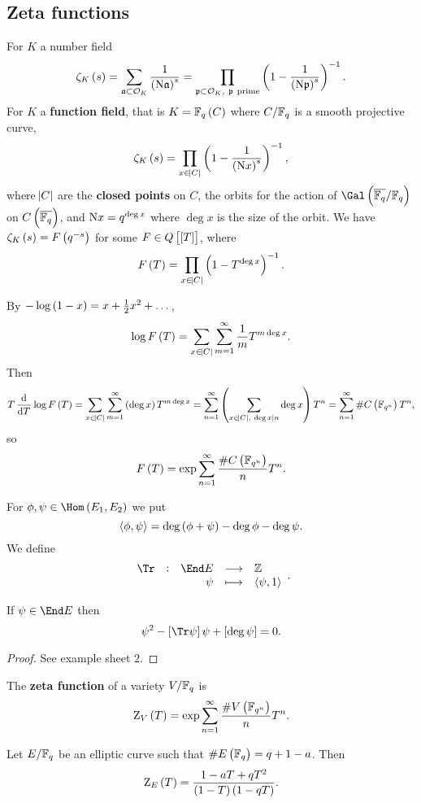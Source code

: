 \subsection{Zeta functions}

For $ K $ a number field
$$ \zeta_K\br{s} = \sum_{\aaa \subset \OOO_K} \dfrac{1}{\br{\N\aaa}^s} = \prod_{\ppp \subset \OOO_K, \ \ppp \ \text{prime}} \br{1 - \dfrac{1}{\br{\N\ppp}^s}}^{-1}. $$
For $ K $ a \textbf{function field}, that is $ K = \FF_q\br{C} $ where $ C / \mathbb{F}_q $ is a smooth projective curve,
$$ \zeta_K\br{s} = \prod_{x \in \abs{C}} \br{1 - \dfrac{1}{\br{\N x}^s}}^{-1}, $$
where $ \abs{C} $ are the \textbf{closed points} on $ C $, the orbits for the action of $ \Gal\br{\overline{\FF_q} / \FF_q} $ on $ C\br{\overline{\FF_q}} $, and $ \mathrm{N} x = q^{\deg x} $ where $ \deg x $ is the size of the orbit. We have $ \zeta_K\br{s} = F\br{q^{-s}} $ for some $ F \in Q\sbr{\sbr{T}} $, where
$$ F\br{T} = \prod_{x \in \abs{C}} \br{1 - T^{\deg x}}^{-1}. $$

\pagebreak

By $ -\log \br{1 - x} = x + \tfrac{1}{2}x^2 + \dots $,
$$ \log F\br{T} = \sum_{x \in \abs{C}} \sum_{m = 1}^\infty \dfrac{1}{m}T^{m\deg x}. $$
Then
$$ T\dod{}{T}\log F\br{T} = \sum_{x \in \abs{C}} \sum_{m = 1}^\infty \br{\deg x}T^{m\deg x} = \sum_{n = 1}^\infty \br{\sum_{x \in \abs{C}, \ \deg x \mid n} \deg x}T^n = \sum_{n = 1}^\infty \#C\br{\FF_{q^n}}T^n, $$
so
$$ F\br{T} = \exp \sum_{n = 1}^\infty \dfrac{\#C\br{\FF_{q^n}}}{n}T^n. $$


For $ \phi, \psi \in \Hom\br{E_1, E_2} $ we put
$$ \abr{\phi, \psi} = \deg \br{\phi + \psi} - \deg \phi - \deg \psi. $$
We define
$$ \function[\Tr]{\End E}{\ZZ}{\psi}{\abr{\psi, 1}}. $$

\begin{lemma}
\label{lem:7.3}
If $ \psi \in \End E $ then
$$ \psi^2 - \sbr{\Tr \psi}\psi + \sbr{\deg \psi} = 0. $$
\end{lemma}

\begin{proof}
See example sheet $ 2 $.
\end{proof}

\begin{definition*}
The \textbf{zeta function} of a variety $ V / \mathbb{F}_q $ is
$$ \Z_V\br{T} = \exp \sum_{n = 1}^\infty \dfrac{\#V\br{\FF_{q^n}}}{n}T^n. $$
\end{definition*}

\begin{lemma}
Let $ E / \mathbb{F}_q $ be an elliptic curve such that $ \#E\br{\FF_q} = q + 1 - a $. Then
$$ \Z_E\br{T} = \dfrac{1 - aT + qT^2}{\br{1 - T}\br{1 - qT}}. $$
\end{lemma}

